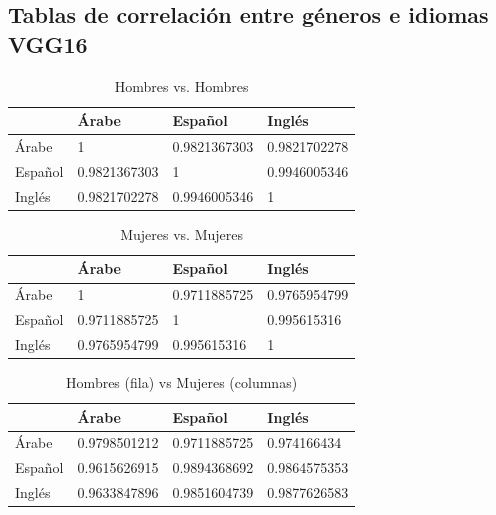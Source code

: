 \documentclass[runningheads]{llncs}
\begin{document}
\subsection{Tablas de correlación entre géneros e idiomas VGG16}
\begin{table}[!h]

\centering
\caption{Hombres vs. Hombres}
\label{male-vs-male-correlation}
\begin{tabular}{|l|l|l|l|}
\hline
        & Árabe        & Español      & Inglés       \\ \hline
Árabe   & 1            & 0.9821367303 & 0.9821702278 \\ \hline
Español & 0.9821367303 & 1            & 0.9946005346 \\ \hline
Inglés  & 0.9821702278 & 0.9946005346 & 1            \\ \hline
\end{tabular}
\end{table}

\begin{table}[!h]
\centering
\caption{Mujeres vs. Mujeres}
\label{female-vs-female-correlation}
\begin{tabular}{|l|l|l|l|}
\hline
        & Árabe        & Español      & Inglés       \\ \hline
Árabe   & 1            & 0.9711885725 & 0.9765954799 \\ \hline
Español & 0.9711885725 & 1            & 0.995615316  \\ \hline
Inglés  & 0.9765954799 & 0.995615316  & 1            \\ \hline
\end{tabular}
\end{table}

\begin{table}[!h]
\centering
\caption{Hombres (fila) vs Mujeres (columnas)}
\label{male-female-correlation}
\begin{tabular}{|l|l|l|l|}
\hline
        & Árabe        & Español      & Inglés       \\ \hline
Árabe   & 0.9798501212 & 0.9711885725 & 0.974166434  \\ \hline
Español & 0.9615626915 & 0.9894368692 & 0.9864575353 \\ \hline
Inglés  & 0.9633847896 & 0.9851604739 & 0.9877626583 \\ \hline
\end{tabular}
\end{table}


\newpage
\end{document}
